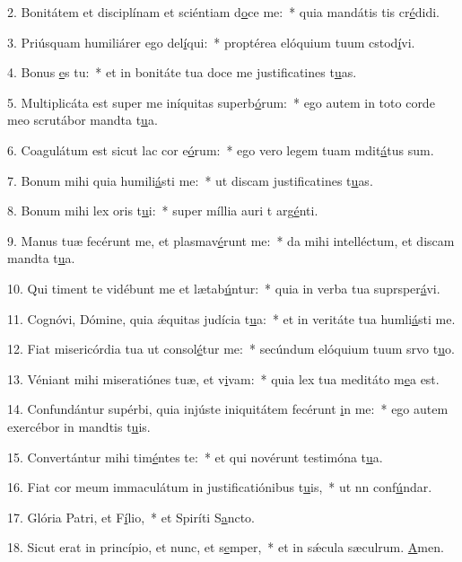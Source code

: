 2. Bonitátem et disciplínam et sciéntiam d\uline{o}ce me:~* quia mandátis tis cr\uline{é}didi.\par 
3. Priúsquam humiliárer ego del\uline{í}qui:~* proptérea elóquium tuum cstod\uline{í}vi.\par 
4. Bonus \uline{e}s tu:~* et in bonitáte tua doce me justificatines t\uline{u}as.\par 
5. Multiplicáta est super me iníquitas superb\uline{ó}rum:~* ego autem in toto corde meo scrutábor mandta t\uline{u}a.\par 
6. Coagulátum est sicut lac cor e\uline{ó}rum:~* ego vero legem tuam mdit\uline{á}tus sum.\par 
7. Bonum mihi quia humili\uline{á}sti me:~* ut discam justificatines t\uline{u}as.\par 
8. Bonum mihi lex oris t\uline{u}i:~* super míllia auri t arg\uline{é}nti.\par 
9. Manus tuæ fecérunt me, et plasmav\uline{é}runt me:~* da mihi intelléctum, et discam mandta t\uline{u}a.\par 
10. Qui timent te vidébunt me et lætab\uline{ú}ntur:~* quia in verba tua suprsper\uline{á}vi.\par 
11. Cognóvi, Dómine, quia ǽquitas judícia t\uline{u}a:~* et in veritáte tua humli\uline{á}sti me.\par 
12. Fiat misericórdia tua ut consol\uline{é}tur me:~* secúndum elóquium tuum srvo t\uline{u}o.\par 
13. Véniant mihi miseratiónes tuæ, et v\uline{i}vam:~* quia lex tua meditáto m\uline{e}a est.\par 
14. Confundántur supérbi, quia injúste iniquitátem fecérunt \uline{i}n me:~* ego autem exercébor in mandtis t\uline{u}is.\par 
15. Convertántur mihi tim\uline{é}ntes te:~* et qui novérunt testimóna t\uline{u}a.\par 
16. Fiat cor meum immaculátum in justificatiónibus t\uline{u}is,~* ut nn conf\uline{ú}ndar.\par 
17. Glória Patri, et F\uline{í}lio,~* et Spiríti S\uline{a}ncto.\par 
18. Sicut erat in princípio, et nunc, et s\uline{e}mper,~* et in sǽcula sæculrum. \uline{A}men.\par 
